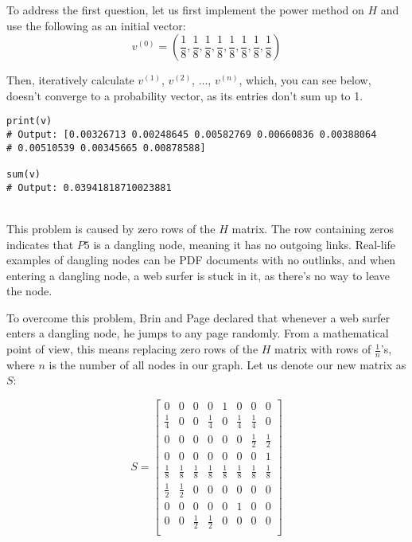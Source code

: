 \documentclass{article}
\begin{document}
To address the first question, let us first implement the power method on \( H \) and use the following as an initial vector: 
\[ v^{(0)} = \left( \frac{1}{8}, \frac{1}{8}, \frac{1}{8}, \frac{1}{8}, \frac{1}{8}, \frac{1}{8}, \frac{1}{8}, \frac{1}{8} \right) \]

Then, iteratively calculate \( v^{(1)} \), \( v^{(2)} \), ..., \( v^{(n)} \), which, you can see below, doesn't converge to a probability vector, as its entries don’t sum up to 1.

\begin{verbatim}
print(v)
# Output: [0.00326713 0.00248645 0.00582769 0.00660836 0.00388064 
# 0.00510539 0.00345665 0.00878588]

sum(v)
# Output: 0.03941818710023881
\end{verbatim}
\\

This problem is caused by zero rows of the \( H \) matrix. The row containing zeros indicates that \( P5 \) is a dangling node, meaning it has no outgoing links. Real-life examples of dangling nodes can be PDF documents with no outlinks, and when entering a dangling node, a web surfer is stuck in it, as there's no way to leave the node.

To overcome this problem, Brin and Page declared that whenever a web surfer enters a dangling node, he jumps to any page randomly. From a mathematical point of view, this means replacing zero rows of the \( H \) matrix with rows of \( \frac{1}{n} \)'s, where \( n \) is the number of all nodes in our graph. Let us denote our new matrix as \( S \):

\[
S = \begin{bmatrix}
0 & 0 & 0 & 0 & 1 & 0 & 0 & 0 \\
\frac{1}{4} & 0 & 0 & \frac{1}{4} & 0 & \frac{1}{4} & \frac{1}{4} & 0 \\
0 & 0 & 0 & 0 & 0 & 0 & \frac{1}{2} & \frac{1}{2} \\
0 & 0 & 0 & 0 & 0 & 0 & 0 & 1 \\
\frac{1}{8} & \frac{1}{8} & \frac{1}{8} & \frac{1}{8} & \frac{1}{8} & \frac{1}{8} & \frac{1}{8} & \frac{1}{8} \\
\frac{1}{2} & \frac{1}{2} & 0 & 0 & 0 & 0 & 0 & 0 \\
0 & 0 & 0 & 0 & 0 & 1 & 0 & 0 \\
0 & 0 & \frac{1}{2} & \frac{1}{2} & 0 & 0 & 0 & 0 \\
\end{bmatrix}
\]
\\
\end{document}
